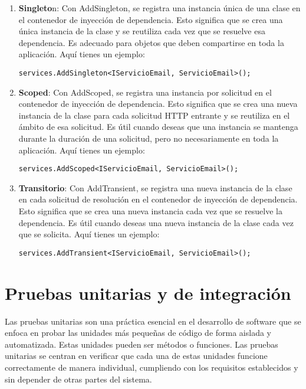 \documentclass[executivepaper]{article}
\begin{document}
\begin{enumerate}
    \item \textbf{Singleto}n: Con AddSingleton, se registra una instancia única de una clase en el contenedor de inyección de dependencia. Esto significa que se crea una única instancia de la clase y se reutiliza cada vez que se resuelve esa dependencia. Es adecuado para objetos que deben compartirse en toda la aplicación. Aquí tienes un ejemplo:
   \begin{lstlisting}
services.AddSingleton<IServicioEmail, ServicioEmail>();
\end{lstlisting}
    \item \textbf{Scoped}: Con AddScoped, se registra una instancia por solicitud en el contenedor de inyección de dependencia. Esto significa que se crea una nueva instancia de la clase para cada solicitud HTTP entrante y se reutiliza en el ámbito de esa solicitud. Es útil cuando deseas que una instancia se mantenga durante la duración de una solicitud, pero no necesariamente en toda la aplicación. Aquí tienes un ejemplo:
   \begin{lstlisting}
services.AddScoped<IServicioEmail, ServicioEmail>();
\end{lstlisting}
    \item \textbf{Transitorio}: Con AddTransient, se registra una nueva instancia de la clase en cada solicitud de resolución en el contenedor de inyección de dependencia. Esto significa que se crea una nueva instancia cada vez que se resuelve la dependencia. Es útil cuando deseas una nueva instancia de la clase cada vez que se solicita. Aquí tienes un ejemplo:
   \begin{lstlisting}
services.AddTransient<IServicioEmail, ServicioEmail>();
\end{lstlisting}
\end{enumerate}

\section{Pruebas unitarias y de integración}
Las pruebas unitarias son una práctica esencial en el desarrollo de software que se enfoca en probar las unidades más pequeñas de código de forma aislada y automatizada. Estas unidades pueden ser métodos o funciones. Las pruebas unitarias se centran en verificar que cada una de estas unidades funcione correctamente de manera individual, cumpliendo con los requisitos establecidos y sin depender de otras partes del sistema.
\end{document}
